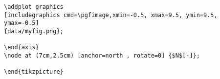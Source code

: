 \begin{itemize}
\begin{lstlisting}
\addplot graphics 
[includegraphics cmd=\pgfimage,xmin=-0.5, xmax=9.5, ymin=9.5, ymax=-0.5] 
{data/myfig.png};

\end{axis}
\node at (7cm,2.5cm) [anchor=north , rotate=0] {$N$[-]};

\end{tikzpicture}
\end{lstlisting}

\end{itemize}

